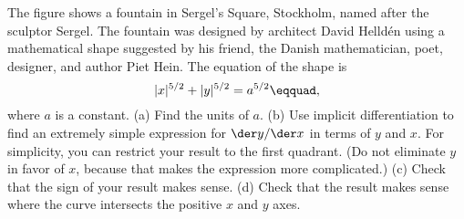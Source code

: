 The figure shows a fountain in Sergel's Square, Stockholm, named after
the sculptor Sergel. The fountain was designed by 
architect David Helld\'en using a mathematical shape suggested by his friend,
the Danish mathematician,
poet, designer, and author Piet Hein. The equation of the shape is
\begin{equation*}
  |x|^{5/2}+|y|^{5/2} = a^{5/2}\eqquad,
\end{equation*}
where $a$ is a constant.
(a) Find the units of $a$.
(b) Use implicit differentiation to find
an extremely simple expression for  $\der y/\der x$ in terms of $y$ and $x$.
For simplicity, you can restrict your result to the first quadrant.
(Do not eliminate $y$ in favor of $x$, because that makes the expression more complicated.)
(c) Check that the sign of your result makes sense.
(d) Check that the result makes sense where the curve intersects the positive
$x$ and $y$ axes.
